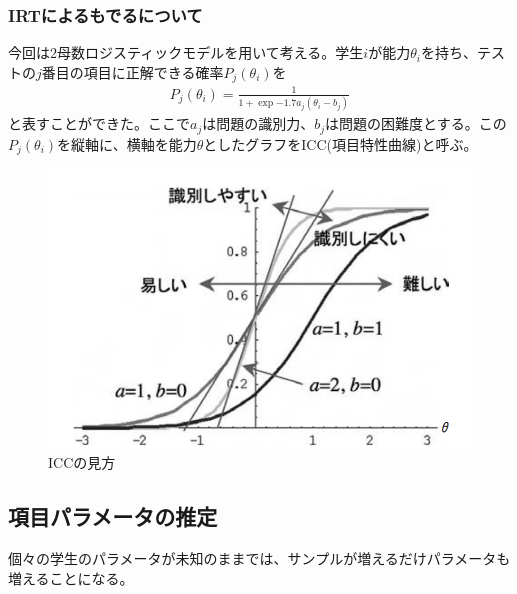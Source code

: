 \documentclass[12pt]{jarticle}
\begin{document}
\subsubsection{IRTによるもでるについて}
今回は$2$母数ロジスティックモデルを用いて考える。学生$i$が能力$\theta_i$を持ち、テストの$j$番目の項目に正解できる確率$P_j(\theta_i)$を
\begin{align}
  \label{00}
  \displaystyle P_j(\theta_i) = \frac{1}{1 + \exp{-1.7a_j}(\theta_i - b_j)} \tag{1}
\end{align}
と表すことができた。ここで$a_j$は問題の識別力、$b_j$は問題の困難度とする。この$P_j(\theta_i)$を縦軸に、横軸を能力$\theta$としたグラフをICC(項目特性曲線)と呼ぶ。
\newpage
\begin{figure}[H]
  \includegraphics[bb = -300 300 1 1,scale = 0.4]{01.png}
  \vspace{4cm}
  \caption{ICCの見方}
\end{figure}
\subsection{項目パラメータの推定}
個々の学生のパラメータが未知のままでは、サンプルが増えるだけパラメータも増えることになる。
\end{document}
